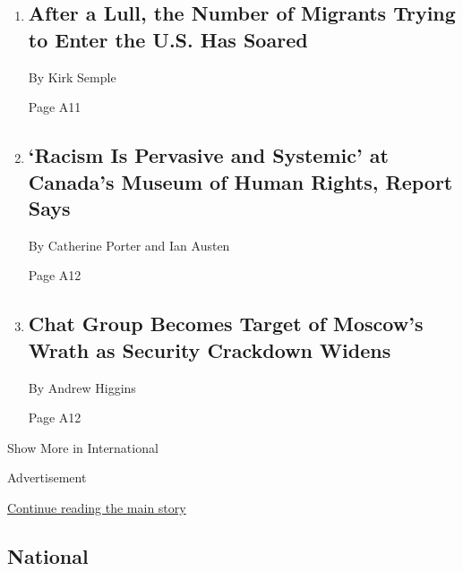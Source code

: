 \begin{enumerate}
\def\labelenumi{\arabic{enumi}.}
\item
  \href{/2020/08/06/world/americas/mexico-immigration-usa.html}{}

  \hypertarget{after-a-lull-the-number-of-migrants-trying-to-enter-the-us-has-soared-1}{%
  \subsection{After a Lull, the Number of Migrants Trying to Enter the
  U.S. Has
  Soared}\label{after-a-lull-the-number-of-migrants-trying-to-enter-the-us-has-soared-1}}

  By Kirk Semple

  Page A11
\item
  \href{/2020/08/06/world/canada/museum-of-human-rights-discrimination.html}{}

  \hypertarget{racism-is-pervasive-and-systemic-at-canadas-museum-of-human-rights-report-says}{%
  \subsection{`Racism Is Pervasive and Systemic' at Canada's Museum of
  Human Rights, Report
  Says}\label{racism-is-pervasive-and-systemic-at-canadas-museum-of-human-rights-report-says}}

  By Catherine Porter and Ian Austen

  Page A12
\item
  \href{/2020/08/06/world/europe/russia-extremisim-chat-group-sentence.html}{}

  \hypertarget{chat-group-becomes-target-of-moscows-wrath-as-security-crackdown-widens}{%
  \subsection{Chat Group Becomes Target of Moscow's Wrath as Security
  Crackdown
  Widens}\label{chat-group-becomes-target-of-moscows-wrath-as-security-crackdown-widens}}

  By Andrew Higgins

  Page A12
\end{enumerate}

Show More in International

Advertisement

\protect\hyperlink{after-mid2}{Continue reading the main story}

\hypertarget{national}{%
\subsection{National}\label{national}}

